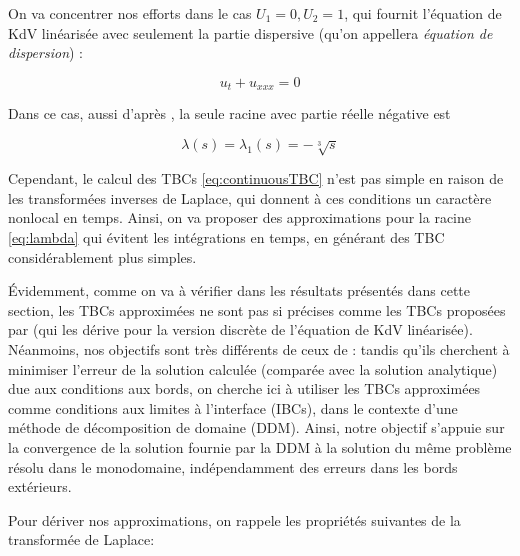 \indent On va concentrer nos efforts dans le cas $U_1 = 0, U_2 = 1$, qui fournit l'équation de KdV linéarisée avec seulement la partie dispersive (qu'on appellera \emph{équation de dispersion}) :

\begin{equation}
	\label{eq:DKdV}
	u_t + u_{xxx} = 0
\end{equation}

\indent Dans ce cas, aussi d'après \cite{zheng2008}, la seule racine avec partie réelle négative est

\begin{equation}
	\label{eq:lambda}
			\lambda(s) = \lambda_1(s) =  -\sqrt[3]{s} 
\end{equation}

\indent Cependant, le calcul des TBCs \eqref{eq:continuousTBC} n'est pas simple en raison de les transformées inverses de Laplace, qui donnent à ces conditions un caractère nonlocal en temps. Ainsi, on va proposer des approximations pour la racine \eqref{eq:lambda} qui évitent les intégrations en temps, en générant des TBC considérablement plus simples.


\indent Évidemment, comme on va à vérifier dans les résultats présentés dans cette section, les TBCs approximées ne sont pas si précises comme les TBCs proposées par \cite{besse2015} (qui les dérive pour la version discrète de l'équation de KdV linéarisée). Néanmoins, nos objectifs sont très différents de ceux de \cite{besse2015} : tandis qu'ils cherchent à minimiser l'erreur de la solution calculée (comparée avec la solution analytique) due aux conditions aux bords, on cherche ici à utiliser les TBCs approximées comme conditions aux limites à l'interface (IBCs), dans le contexte d'une méthode de décomposition de domaine (DDM). Ainsi, notre objectif s'appuie sur la convergence de la solution fournie par la DDM à la solution du même problème résolu dans le monodomaine,  indépendamment des erreurs dans les bords extérieurs. 

\indent Pour dériver nos approximations, on rappele les propriétés suivantes \cite{laplaceTransform} de la transformée de Laplace:

